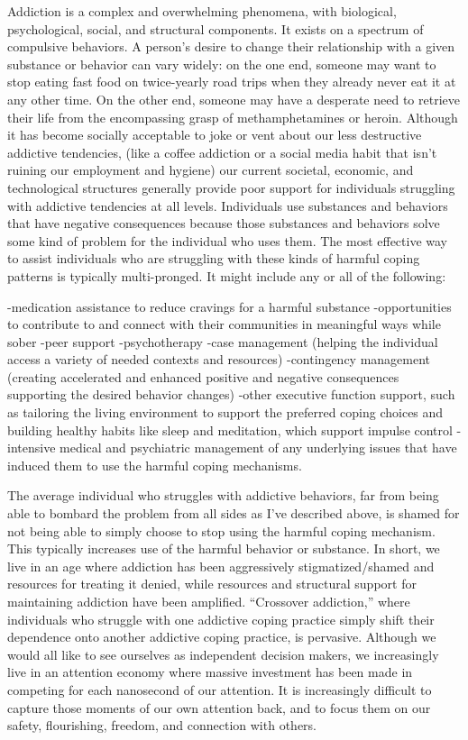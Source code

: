 \documentclass[12pt,letterpaper]{book}
\begin{document}
Addiction is a complex and overwhelming phenomena, with biological, psychological, social, and structural components. It exists on a spectrum of compulsive behaviors. A person's desire to change their relationship with a given substance or behavior can vary widely: on the one end, someone may want to stop eating fast food on twice-yearly road trips when they already never eat it at any other time. On the other end, someone may have a desperate need to retrieve their life from the encompassing grasp of methamphetamines or heroin. Although it has become socially acceptable to joke or vent about our less destructive addictive tendencies, (like a coffee addiction or a social media habit that isn't ruining our employment and hygiene) our current societal, economic, and technological structures generally provide poor support for individuals struggling with addictive tendencies at all levels. Individuals use substances and behaviors that have negative consequences because those substances and behaviors solve some kind of problem for the individual who uses them. The most effective way to assist individuals who are struggling with these kinds of harmful coping patterns is typically multi-pronged. It might include any or all of the following:

-medication assistance to reduce cravings for a harmful substance
-opportunities to contribute to and connect with their communities in meaningful ways while sober
-peer support
-psychotherapy
-case management (helping the individual access a variety of needed contexts and resources)
-contingency management (creating accelerated and enhanced positive and negative consequences supporting the desired behavior changes) 
-other executive function support, such as tailoring the living environment to support the preferred coping choices and building healthy habits like sleep and meditation, which support impulse control
-intensive medical and psychiatric management of any underlying issues that have induced them to use the harmful coping mechanisms.

The average individual who struggles with addictive behaviors, far from being able to bombard the problem from all sides as I've described above, is shamed for not being able to simply choose to stop using the harmful coping mechanism. This typically increases use of the harmful behavior or substance. In short, we live in an age where addiction has been aggressively stigmatized/shamed and resources for treating it denied, while resources and structural support for maintaining addiction have been amplified. “Crossover addiction,” where individuals who struggle with one addictive coping practice simply shift their dependence onto another addictive coping practice, is pervasive. Although we would all like to see ourselves as independent decision makers, we increasingly live in an attention economy where massive investment has been made in competing for each nanosecond of our attention. It is increasingly difficult to capture those moments of our own attention back, and to focus them on our safety, flourishing, freedom, and connection with others.
\end{document}
